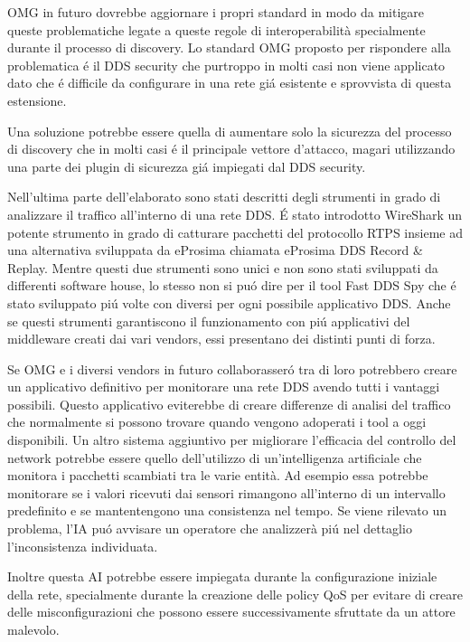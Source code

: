 OMG in futuro dovrebbe aggiornare i propri standard in modo da 
mitigare queste problematiche legate a queste regole di interoperabilità
specialmente durante il 
processo di discovery. Lo standard OMG proposto per rispondere alla problematica
é il DDS security che purtroppo in molti casi 
non viene applicato dato che é difficile da 
configurare in una rete giá esistente e sprovvista di questa estensione.

Una soluzione potrebbe essere quella di aumentare solo la sicurezza del 
processo di discovery che in molti casi é il 
principale vettore d'attacco, magari 
utilizzando una parte dei plugin di sicurezza giá impiegati dal DDS security.

Nell'ultima parte dell'elaborato sono stati descritti degli strumenti 
in grado di analizzare il traffico all'interno di una rete DDS.
É stato introdotto WireShark un potente strumento in grado di 
catturare pacchetti del protocollo RTPS insieme ad una alternativa
sviluppata da eProsima chiamata eProsima DDS Record \&
Replay. Mentre questi due strumenti sono unici e non sono stati 
sviluppati da differenti software house, lo stesso non 
si puó dire per il tool Fast DDS Spy che é stato sviluppato 
piú volte con diversi per ogni possibile 
applicativo DDS.
Anche se questi strumenti garantiscono il funzionamento 
con piú applicativi del middleware creati dai vari vendors, essi
presentano dei distinti punti di forza. 

Se OMG e i diversi vendors in futuro collaborasseró tra di loro 
potrebbero creare un applicativo definitivo per monitorare 
una rete DDS avendo tutti i vantaggi possibili. Questo applicativo 
eviterebbe di creare differenze di analisi del
traffico che normalmente 
si possono trovare quando vengono adoperati i tool a oggi 
disponibili.
Un altro sistema aggiuntivo per migliorare l'efficacia del 
controllo del network potrebbe essere quello 
dell'utilizzo di un'intelligenza artificiale che monitora 
i pacchetti scambiati tra le varie entità. 
Ad esempio essa potrebbe monitorare se i valori ricevuti dai sensori 
rimangono all'interno di un intervallo predefinito e se 
mantentengono una consistenza nel tempo. Se viene rilevato 
un problema, l'IA puó avvisare un operatore che 
analizzerà piú nel dettaglio l'inconsistenza individuata.

Inoltre questa AI potrebbe 
essere impiegata durante la configurazione iniziale della rete,
specialmente durante la creazione delle policy QoS per evitare
di creare delle misconfigurazioni che possono essere
successivamente sfruttate da un attore malevolo.

